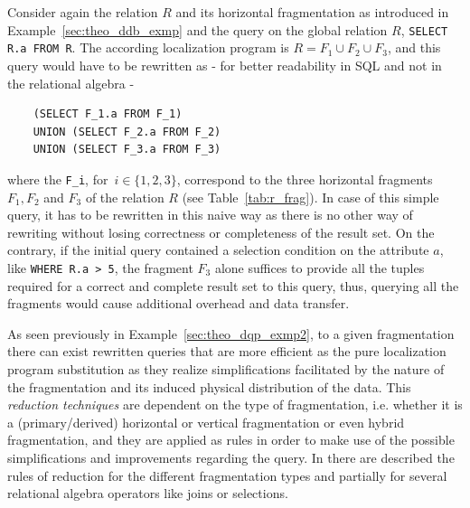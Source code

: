 \begin{exmp}
\label{sec:theo_dqp_exmp2}
Consider again the relation $R$ and its horizontal fragmentation as introduced in Example~\ref{sec:theo_ddb_exmp} and the query on the global relation $R$,
\verb!SELECT R.a FROM R!. The according localization program is $R=F_1 \cup F_2 \cup F_3$, and this query would have to be rewritten as - for better
readability in SQL and not in the relational algebra -
\begin{verbatim}
    (SELECT F_1.a FROM F_1) 
    UNION (SELECT F_2.a FROM F_2) 
    UNION (SELECT F_3.a FROM F_3)
\end{verbatim}
where the \verb!F_i!, for~$i\in\{1,2,3\}$, correspond to the three horizontal fragments $F_1, F_2$ and $F_3$ of the relation $R$ (see 
Table~\ref{tab:r_frag}). In case of this simple query, it has to be rewritten in this naive way as there is no other way of rewriting without losing
correctness or completeness of the result set. 
On the contrary, if the initial query contained a selection condition on the attribute $a$, like \verb!WHERE R.a > 5!, the fragment $F_3$ alone suffices 
to provide all the tuples required for a correct and complete result set to this query, thus, querying all the fragments would cause additional overhead
and data transfer.
\end{exmp}

As seen previously in Example~\ref{sec:theo_dqp_exmp2}, to a given fragmentation there can exist rewritten queries that are more efficient as the pure
localization program substitution as they realize simplifications facilitated by the nature of the fragmentation and its induced physical distribution of
the data. This \emph{reduction techniques} \cite[p.~199]{Ozsu1991} are dependent on the type of fragmentation, i.e. whether it is a (primary/derived)
horizontal or vertical fragmentation or even hybrid fragmentation, and they are applied as rules in order to make use of the possible simplifications and 
improvements regarding the query. In \citet[p.~199ff.]{Ozsu1991} there are described the rules of reduction for the different fragmentation types and 
partially for several relational algebra operators like joins or selections.


